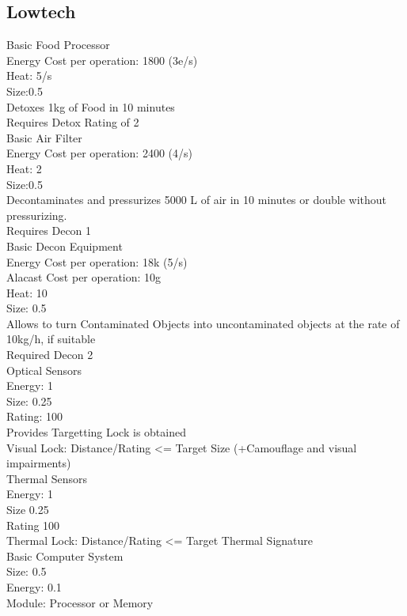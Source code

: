 \subsection{Lowtech}\label{subsec:lowtech}
Basic Food Processor\\
Energy Cost per operation: 1800 (3e/s)\\
Heat: 5/s \\
Size:0.5\\
Detoxes 1kg of Food in 10 minutes \\
Requires Detox Rating of 2\\
\newline
Basic Air Filter\\
Energy Cost per operation: 2400 (4/s)\\
Heat: 2\\
Size:0.5\\
Decontaminates and pressurizes 5000 L of air in  10 minutes or double without pressurizing. \\
Requires Decon 1\\
\newline
Basic Decon Equipment \\
Energy Cost per operation: 18k (5/s)\\
Alacast Cost per operation: 10g\\
Heat: 10 \\
Size: 0.5\\
Allows to turn Contaminated Objects into uncontaminated objects at the rate of 10kg/h, if suitable\\
Required Decon 2\\
\newline
Optical Sensors\\
Energy: 1\\
Size: 0.25 \\
Rating: 100\\
Provides Targetting Lock is obtained\\
Visual Lock: Distance/Rating <= Target Size (+Camouflage and visual impairments)\\
\newline
Thermal Sensors\\
Energy: 1\\
Size 0.25\\
Rating 100\\
Thermal Lock: Distance/Rating <= Target Thermal Signature\\
\newline
Basic Computer System\\
Size: 0.5\\
Energy: 0.1\\
Module: Processor or Memory\\
\newline
